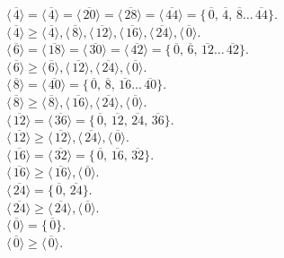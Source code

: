 \documentclass{article}
\newcommand{\olsi}[1]{\,\overline{\!{#1}}}
\begin{document}
    $\langle \olsi{4} \rangle
    = \langle \olsi{4} \rangle = \langle \olsi{20} \rangle
    = \langle \olsi{28} \rangle = \langle \olsi{44} \rangle
    = \{\olsi{0}, \olsi{4}, \olsi{8} \dots \olsi{44}\}$. \\
    $\langle \olsi{4} \rangle \geqslant
    \langle \olsi{4} \rangle,
    \langle \olsi{8} \rangle,
    \langle \olsi{12} \rangle,
    \langle \olsi{16} \rangle,
    \langle \olsi{24} \rangle,
    \langle \olsi{0} \rangle$. \\
    $\langle \olsi{6} \rangle
    = \langle \olsi{18} \rangle = \langle \olsi{30} \rangle
    = \langle \olsi{42} \rangle
    = \{\olsi{0}, \olsi{6}, \olsi{12} \dots \olsi{42}\}$. \\
    $\langle \olsi{6} \rangle \geqslant
    \langle \olsi{6} \rangle,
    \langle \olsi{12} \rangle,
    \langle \olsi{24} \rangle,
    \langle \olsi{0} \rangle$. \\
    $\langle \olsi{8} \rangle
    = \langle \olsi{40} \rangle
    = \{\olsi{0}, \olsi{8}, \olsi{16} \dots \olsi{40}\}$. \\
    $\langle \olsi{8} \rangle \geqslant
    \langle \olsi{8} \rangle,
    \langle \olsi{16} \rangle,
    \langle \olsi{24} \rangle,
    \langle \olsi{0} \rangle$. \\
    $\langle \olsi{12} \rangle
    = \langle \olsi{36} \rangle
    = \{\olsi{0}, \olsi{12}, \olsi{24}, \olsi{36}\}$. \\
    $\langle \olsi{12} \rangle \geqslant
    \langle \olsi{12} \rangle,
    \langle \olsi{24} \rangle,
    \langle \olsi{0} \rangle$. \\
    $\langle \olsi{16} \rangle
    = \langle \olsi{32} \rangle
    = \{\olsi{0}, \olsi{16}, \olsi{32}\}$. \\
    $\langle \olsi{16} \rangle \geqslant
    \langle \olsi{16} \rangle,
    \langle \olsi{0} \rangle$. \\
    $\langle \olsi{24} \rangle
    = \{\olsi{0}, \olsi{24}\}$. \\
    $\langle \olsi{24} \rangle \geqslant
    \langle \olsi{24} \rangle,
    \langle \olsi{0} \rangle$. \\
    $\langle \olsi{0} \rangle
    = \{\olsi{0}\}$. \\
    $\langle \olsi{0} \rangle \geqslant
    \langle \olsi{0} \rangle$. \\
    
\end{document}

